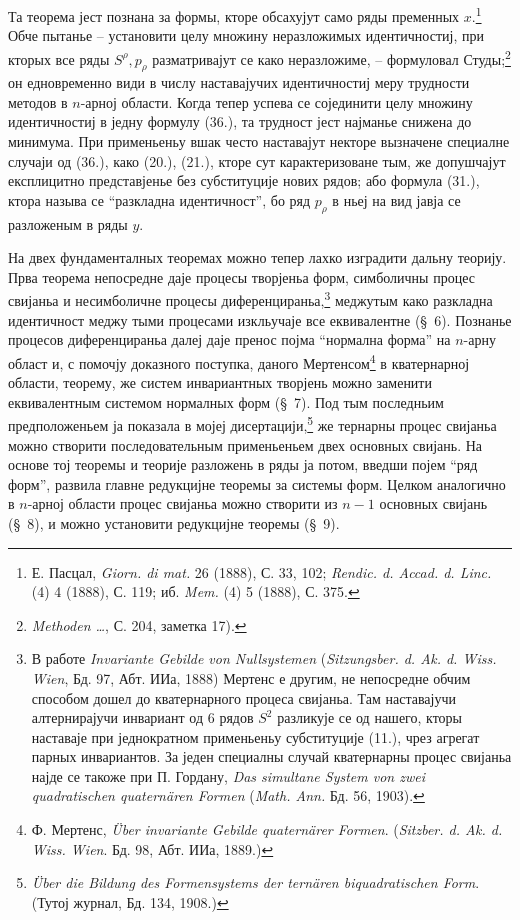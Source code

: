 \documentclass[11pt]{article}
\begin{document}
Та теорема јест познана за формы, кторе обсахујут само ряды пременных $x$.\footnote{Е. Пасцал, \emph{Giorn. di mat.} 26 (1888), С. 33, 102; \emph{Rendic. d. Accad. d. Linc.} (4) 4 (1888), С. 119; иб. \emph{Mem.} (4) 5 (1888), С. 375.} Обче пытанье -- установити целу множину неразложимых идентичностиј, при кторых все ряды $S^\rho,p_\rho$ разматривајут се како неразложиме, -- формуловал Студы;\footnote{\emph{Methoden \dots}, С. 204, заметка 17).} он едновременно види в числу наставајучих идентичностиј меру трудности методов в $n$-арној области. Когда тепер успева се сојединити целу множину идентичностиј в једну формулу (36.), та трудност јест најманье снижена до минимума. При применьеньу вшак често наставајут некторе вызначене специалне случаји од (36.), како (20.), (21.), кторе сут карактеризоване тым, же допушчајут експлицитно представјенье без субституције нових рядов; або формула (31.), ктора называ се ``разкладна идентичност'', бо ряд $p_\rho$ в ньеј на вид јавја се разложеным в ряды $y$.

На двех фундаменталных теоремах можно тепер лахко изградити дальну теорију. Прва теорема непосредне даје процесы творјеньа форм, симболичны процес свијаньа и несимболичне процесы диференцираньа,\footnote{В работе \emph{Invariante Gebilde von Nullsystemen} (\emph{Sitzungsber. d. Ak. d. Wiss. Wien}, Бд. 97, Абт. ИИа, 1888) Мертенс е другим, не непосредне обчим способом дошел до кватернарного процеса свијаньа. Там наставајучи алтернирајучи инвариант од 6 рядов $S^2$ разликује се од нашего, кторы наставаје при једнократном применьеньу субституције (11.), чрез агрегат парных инвариантов. За једен специалны случай кватернарны процес свијаньа најде се такоже при П. Гордану, \emph{Das simultane System von zwei quadratischen quaternären Formen} (\emph{Math. Ann.} Бд. 56, 1903).} меджутым како разкладна идентичност меджу тыми процесами изкльучаје все еквивалентне (\S\ 6). Познанье процесов диференцираньа далеј даје пренос појма ``нормална форма'' на $n$-арну област и, с помочју доказного поступка, даного Мертенсом\footnote{Ф. Мертенс, \emph{Über invariante Gebilde quaternärer Formen}. (\emph{Sitzber. d. Ak. d. Wiss. Wien}. Бд. 98, Абт. ИИа, 1889.)} в кватернарној области, теорему, же систем инвариантных творјень можно заменити еквивалентным системом нормалных форм (\S\ 7). Под тым последньим предположеньем ја показала в мојеј дисертацији,\footnote{\emph{Über die Bildung des Formensystems der ternären biquadratischen Form}. (Тутој журнал, Бд. 134, 1908.)} же тернарны процес свијаньа можно створити последовательным применьеньем двех основных свијань. На основе тој теоремы и теорије разложень в ряды ја потом, введши појем ``ряд форм'', развила главне редукцијне теоремы за системы форм. Целком аналогично в $n$-арној области процес свијаньа можно створити из $n-1$ основных свијань (\S\ 8), и можно установити редукцијне теоремы (\S\ 9).
\end{document}
